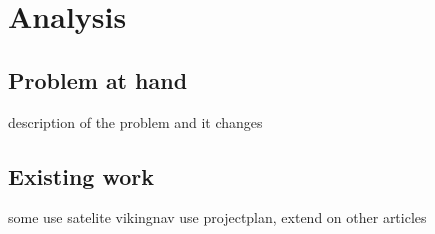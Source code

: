 \chapter{Analysis}\label{ch:analysis}


\section{Problem at hand}

description of the problem and it changes


\section{Existing work}


some use satelite vikingnav
use projectplan, extend on other articles